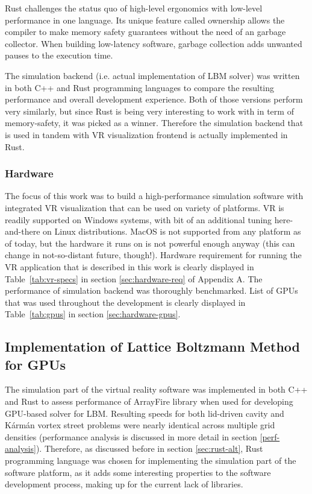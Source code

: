 Rust challenges the status quo of high-level ergonomics with low-level performance in one language. Its unique feature called ownership allows the compiler to make memory safety guarantees without the need of an garbage collector. When building low-latency software, garbage collection adds unwanted pauses to the execution time. 

The simulation backend (i.e. actual implementation of LBM solver) was written in both C++ and Rust programming languages to compare the resulting performance and overall development experience. Both of those versions perform very similarly, but since Rust is being very interesting to work with in term of memory-safety, it was picked as a winner. Therefore the simulation backend that is used in tandem with VR visualization frontend is actually implemented in Rust. 

\subsubsection{Hardware}
The focus of this work was to build a high-performance simulation software with integrated VR visualization that can be used on variety of platforms. VR is readily supported on Windows systems, with bit of an additional tuning here-and-there on Linux distributions. MacOS is not supported from any platform as of today, but the hardware it runs on is not powerful enough anyway (this can change in not-so-distant future, though!). Hardware requirement for running the VR application that is described in this work is clearly displayed in Table~\ref{tab:vr-specs} in section \ref{sec:hardware-req} of Appendix A. The performance of simulation backend was thoroughly benchmarked. List of GPUs that was used throughout the development is clearly displayed in Table~\ref{tab:gpus} in section \ref{sec:hardware-gpus}.


\subsection{Implementation of Lattice Boltzmann Method for GPUs}\label{sec:impl-lbm-gpu}
The simulation part of the virtual reality software was implemented in both C++ and Rust to assess performance of ArrayFire library when used for developing GPU-based solver for LBM. Resulting speeds for both lid-driven cavity and Kármán vortex street problems were nearly identical across multiple grid densities (performance analysis is discussed in more detail in section \ref{perf-analysis}). Therefore, as discussed before in section \ref{sec:rust-alt}, Rust programming language was chosen for implementing the simulation part of the software platform, as it adds some interesting properties to the software development process, making up for the current lack of libraries.

